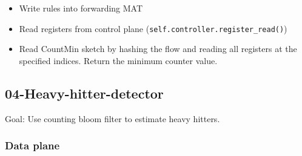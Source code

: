 \documentclass[11pt,oneside,a4paper]{article}
\begin{document}
\vspace{-\topsep}
\begin{itemize}
	\setlength{\itemsep}{0pt}
	\setlength{\parskip}{0pt}
	\item Write rules into forwarding MAT
	\item Read registers from control plane (\texttt{self.controller.register\_read()})
	\item Read CountMin sketch by hashing the flow and reading all registers at the specified indices. Return the minimum counter value.
\end{itemize}
\vspace{-\topsep}

\newpage

\subsection{04-Heavy-hitter-detector}

Goal: Use counting bloom filter to estimate heavy hitters.

\subsubsection{Data plane}
\end{document}
